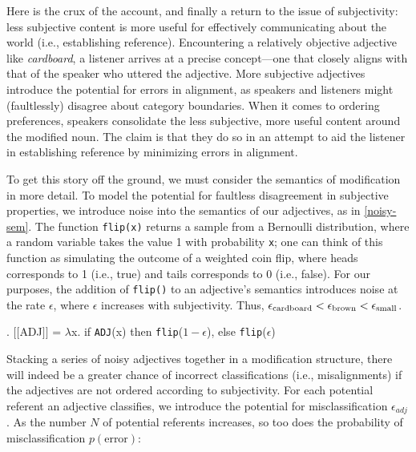 \documentclass[preprint,authoryear]{elsarticle}\frenchspacing
\newcommand{\jd}[1]{\textcolor{Blue}{[jd: #1]}}
\newcommand{\gcs}[1]{\textcolor{blue}{[gcs: #1]}}
\newcommand{\sem}[1]{\mbox{$[\![$#1$]\!]$}}
\newcommand{\lam}{\ensuremath{\lambda}}
\begin{document}
Here is the crux of the account, and finally a return to the issue of subjectivity: less subjective content is more useful for effectively communicating about the world (i.e., establishing reference). %
Encountering a relatively objective adjective like \emph{cardboard}, a listener arrives at a precise concept---one that closely aligns with that of the speaker who uttered the adjective. More subjective adjectives introduce the potential for errors in alignment, as speakers and listeners might (faultlessly) disagree about category boundaries. When it comes to ordering preferences, speakers consolidate the less subjective, more useful content around the modified noun. The claim is that they do so in an attempt to aid the listener in establishing reference by minimizing errors in alignment.

To get this story off the ground, we must consider the semantics of modification in more detail. To model the potential for faultless disagreement in subjective properties, we introduce noise into the semantics of our adjectives, as in \ref{noisy-sem}. The function \texttt{flip(x)} returns a sample from a Bernoulli distribution, where a random variable takes the value 1 with probability \texttt{x}; one can think of this function as simulating the outcome of a weighted coin flip, where heads corresponds to 1 (i.e., true) and tails corresponds to 0 (i.e., false). For our purposes, the addition of \texttt{flip()} to an adjective's semantics introduces noise at the rate $\epsilon$, where $\epsilon$ increases with subjectivity. Thus, $\epsilon_{\footnotesize\textrm{cardboard}} < \epsilon_{\footnotesize\textrm{brown}} < \epsilon_{\footnotesize\textrm{small}}$.

\ex. \label{noisy-sem}
\sem{ADJ} = \lam x. if \texttt{ADJ}(x) then \texttt{flip}($1-\epsilon$), else \texttt{flip}($\epsilon$)

Stacking a series of noisy adjectives together in a modification structure, there will indeed be a greater chance of incorrect classifications (i.e., misalignments) if the adjectives are not ordered according to subjectivity. %
For each potential referent an adjective classifies, we introduce the potential for misclassification $\epsilon_{adj}$. As the number $N$ of potential referents increases, so too does the probability of misclassification $p(\textrm{error})$: 
\end{document}
